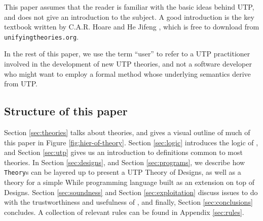 This paper assumes that the reader is familiar
with the basic ideas behind UTP, and does not give an introduction
to the subject. A good introduction is the key textbook written
by C.A.R. Hoare and He Jifeng \cite{UTP-book},
which is free to download from \texttt{unifyingtheories.org}.

In the rest of this paper, we use the term ``user'' to
refer to a UTP practitioner  involved in the development
of new UTP theories, and not a software developer
who might want to employ a formal method whose underlying semantics
derive from UTP.

\subsection{Structure of this paper}

Section \ref{sec:theories} talks about theories,
and gives a visual outline of much of this paper
in Figure \ref{fig:hier-of-theory}.
Section \ref{sec:logic} introduces the logic of ,
and
Section \ref{sec:utp} gives us an introduction to definitions
common to most theories.
In
Section \ref{sec:designs},
and
Section \ref{sec:programs},
we describe how \texttt{Theory}s can be layered up to present
a UTP Theory of Designs, as well as a theory for a simple While programming
language built as an extension on top of Designs.
Section \ref{sec:soundness}
and
Section \ref{sec:exploitation} discuss issues to do with the trustworthiness
and usefulness of ,
and finally,
Section \ref{sec:conclusions} concludes.
A collection of relevant rules can be found in
Appendix \ref{sec:rules}.
